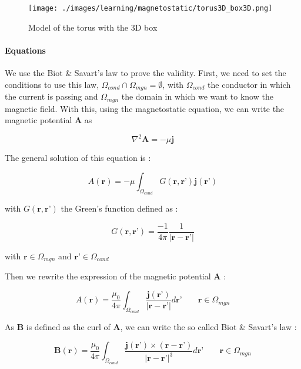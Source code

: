 \documentclass[11pt]{amsart}
\begin{document}
\begin{figure}[h]{}
\centering\texttt{[image: ./images/learning/magnetostatic/torus3D\_box3D.png]}
\caption{Model of the torus with the 3D box}
\centering
\end{figure}

\hypertarget{x-equations}{\paragraph{Equations}}
We use the Biot \& Savart’s law to prove the validity.
First, we need to set the conditions to use this law, $\Omega_{cond}\cap\Omega_{mgn}=\emptyset$,
with $\Omega_{cond}$ the conductor in which the current is passing and
$\Omega_{mgn}$ the domain in which we want to know the magnetic field.
With this, using the magnetostatic equation, we can write the magnetic potential \textbf{A} as



\[
\nabla^{2}\textbf{A}=-\mu\textbf{j}
\]



The general solution of this equation is :



\[
A(\textbf{r})=-\mu\int_{\Omega_{cond}}G(\textbf{r},\textbf{r'})\textbf{j}(\textbf{r'})
\]



with $G(\textbf{r},\textbf{r'})$ the Green’s function defined as :



\[
G(\textbf{r},\textbf{r'})=\frac{-1}{4\pi}\frac{1}{|\textbf{r}-\textbf{r'}|}
\]



with $\textbf{r}\in\Omega_{mgn}$ and $\textbf{r'}\in\Omega_{cond}$


Then we rewrite the expression of the magnetic potential \textbf{A} :



\[
A(\textbf{r})=\frac{\mu_{0}}{4\pi}\int_{\Omega_{cond}}\frac{\textbf{j}(\textbf{r'})}{|\textbf{r}-\textbf{r'}|} d\textbf{r'}\;\;\;\;\;\;\;\textbf{r}\in\Omega_{mgn}
\]



As \textbf{B} is defined as the curl of \textbf{A}, we can write the so called Biot \& Savart’s law :



\[
\textbf{B}(\textbf{r})=\frac{\mu_{0}}{4\pi}\int_{\Omega_{cond}}\frac{\textbf{j}(\textbf{r'})\times(\textbf{r}-\textbf{r'})}{|\textbf{r}-\textbf{r'}|^{3}} d\textbf{r'}\;\;\;\;\;\;\;\textbf{r}\in\Omega_{mgn}
\]
\end{document}
